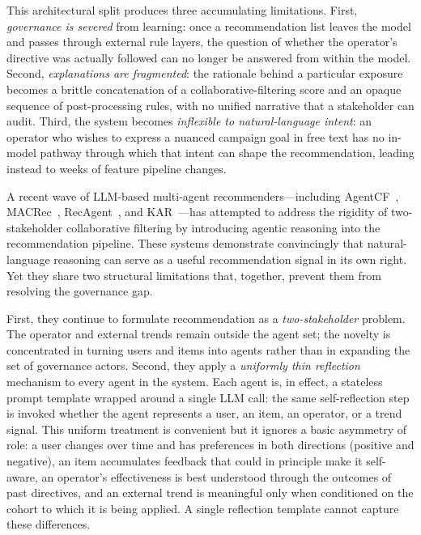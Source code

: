 \documentclass[master,english,final]{postech-ucs}
\begin{document}
This architectural split produces three accumulating limitations.
First, \emph{governance is severed} from learning: once a recommendation list leaves the model and passes through external rule layers, the question of whether the operator's directive was actually followed can no longer be answered from within the model.
Second, \emph{explanations are fragmented}: the rationale behind a particular exposure becomes a brittle concatenation of a collaborative-filtering score and an opaque sequence of post-processing rules, with no unified narrative that a stakeholder can audit.
Third, the system becomes \emph{inflexible to natural-language intent}: an operator who wishes to express a nuanced campaign goal in free text has no in-model pathway through which that intent can shape the recommendation, leading instead to weeks of feature pipeline changes.

A recent wave of LLM-based multi-agent recommenders---including AgentCF~\cite{zhang2024agentcf}, MACRec~\cite{wang2024macrec}, RecAgent~\cite{wang2024recagent}, and KAR~\cite{xi2024kar}---has attempted to address the rigidity of two-stakeholder collaborative filtering by introducing agentic reasoning into the recommendation pipeline.
These systems demonstrate convincingly that natural-language reasoning can serve as a useful recommendation signal in its own right.
Yet they share two structural limitations that, together, prevent them from resolving the governance gap.

First, they continue to formulate recommendation as a \emph{two-stakeholder} problem.
The operator and external trends remain outside the agent set; the novelty is concentrated in turning users and items into agents rather than in expanding the set of governance actors.
Second, they apply a \emph{uniformly thin reflection} mechanism to every agent in the system.
Each agent is, in effect, a stateless prompt template wrapped around a single LLM call: the same self-reflection step is invoked whether the agent represents a user, an item, an operator, or a trend signal.
This uniform treatment is convenient but it ignores a basic asymmetry of role: a user changes over time and has preferences in both directions (positive and negative), an item accumulates feedback that could in principle make it self-aware, an operator's effectiveness is best understood through the outcomes of past directives, and an external trend is meaningful only when conditioned on the cohort to which it is being applied.
A single reflection template cannot capture these differences.
\end{document}
